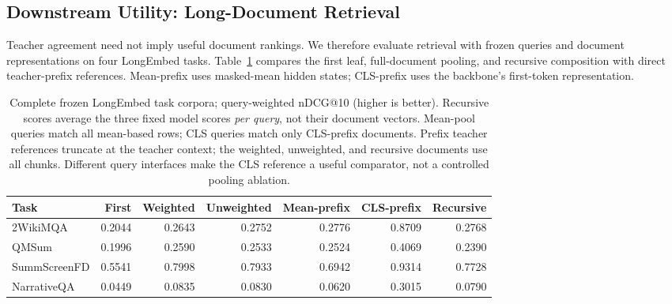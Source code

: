 \documentclass[10pt]{article}
\begin{document}
\subsection{Downstream Utility: Long-Document Retrieval}
\label{sec:retrieval-results}
Teacher agreement need not imply useful document rankings. We therefore
evaluate retrieval with frozen queries and document representations on four
LongEmbed tasks. Table~\ref{tab:review-retrieval} compares the first leaf,
full-document pooling, and recursive composition with direct teacher-prefix
references. Mean-prefix uses masked-mean hidden states; CLS-prefix uses the
backbone's first-token representation.
\begin{table}[t]
\caption{Complete frozen LongEmbed task corpora; query-weighted nDCG@10
(higher is better). Recursive scores average the three fixed model scores
\emph{per query}, not their document vectors. Mean-pool queries match all
mean-based rows; CLS queries match only CLS-prefix documents. Prefix teacher
references truncate at the teacher context; the weighted, unweighted, and
recursive documents use all chunks. Different query interfaces make the CLS
reference a useful comparator, not a controlled pooling ablation.}
\label{tab:review-retrieval}
\centering\small
\begin{tabular}{lrrrrrr}
\toprule
Task & First & Weighted & Unweighted & Mean-prefix & CLS-prefix & Recursive \\
\midrule
2WikiMQA & 0.2044 & 0.2643 & 0.2752 & 0.2776 & 0.8709 & 0.2768 \\
QMSum & 0.1996 & 0.2590 & 0.2533 & 0.2524 & 0.4069 & 0.2390 \\
SummScreenFD & 0.5541 & 0.7998 & 0.7933 & 0.6942 & 0.9314 & 0.7728 \\
NarrativeQA & 0.0449 & 0.0835 & 0.0830 & 0.0620 & 0.3015 & 0.0790 \\
\bottomrule
\end{tabular}
\end{table}
\end{document}

